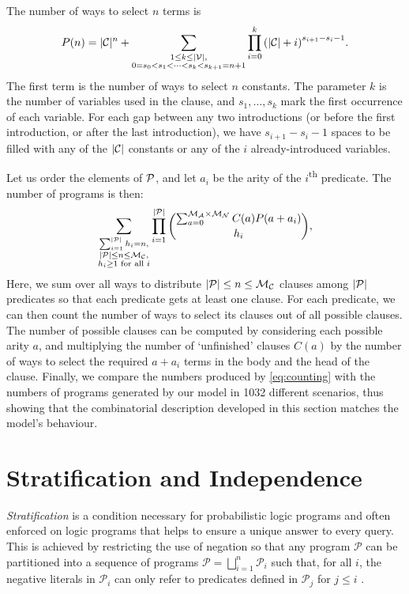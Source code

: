 The number of ways to select $n$ terms is
\[
  P(n) = |\mathcal{C}{}|^n + \sum_{\substack{1 \le k \le |\mathcal{V}{}|, \\ 0 = s_0 < s_1 < \cdots < s_k < s_{k+1} = n+1}} \prod_{i=0}^k {(|\mathcal{C}{}| + i)}^{s_{i+1} - s_i - 1}.
\]
The first term is the number of ways to select $n$ constants. The parameter $k$
is the number of variables used in the clause, and $s_1, \dots, s_k$ mark the
first occurrence of each variable. For each gap between any two introductions
(or before the first introduction, or after the last introduction), we have
$s_{i+1}-s_i-1$ spaces to be filled with any of the $|\mathcal{C}{}|$ constants
or any of the $i$ already-introduced variables.

Let us order the elements of $\mathcal{P}{}$, and let $a_i$ be the arity of the
$i$\textsuperscript{th} predicate. The number of programs is then:
\begin{equation} \label{eq:counting}
  \sum_{\substack{ \sum_{i=1}^{|\mathcal{P}{}|} h_i = n,\\
      |\mathcal{P}{}| \le n \le \mathcal{M}_{\mathcal{C}}{},\\
      h_i \ge 1 \text{ for all } i}} \prod_{i=1}^{|\mathcal{P}{}|}
  \binom{\sum_{a=0}^{\mathcal{M}_{\mathcal{A}}{} \times \mathcal{M}_{\mathcal{N}}{}} C(a) P(a+a_i)}{h_i},
\end{equation}
Here, we sum over all ways to distribute $|\mathcal{P}{}| \le n \le
\mathcal{M}_{\mathcal{C}}{}$ clauses among $|\mathcal{P}{}|$ predicates so that each
predicate gets at least one clause. For each predicate, we can then count the
number of ways to select its clauses out of all possible clauses. The number of
possible clauses can be computed by considering each possible arity $a$, and
multiplying the number of `unfinished' clauses $C(a)$ by the number of ways to
select the required $a+a_i$ terms in the body and the head of the clause.
Finally, we compare the numbers produced by \eqref{eq:counting} with the numbers
of programs generated by our model in \num{1032} different scenarios, thus
showing that the combinatorial description developed in this section matches the
model's behaviour.

\section{Stratification and Independence}\label{sec:independence}

\emph{Stratification} is a condition necessary for probabilistic logic programs
\citep{DBLP:conf/padl/MantadelisR17} and often enforced on logic programs
\citep{DBLP:journals/tcs/Bidoit91} that helps to ensure a unique answer to every
query. This is achieved by restricting the use of negation so that any program
$\mathscr{P}$ can be partitioned into a sequence of programs $\mathscr{P} =
\bigsqcup_{i=1}^n \mathscr{P}_i$ such that, for all $i$, the negative literals
in $\mathscr{P}_i$ can only refer to predicates defined in $\mathscr{P}_j$ for
$j \le i$ \citep{DBLP:journals/tcs/Bidoit91}.

